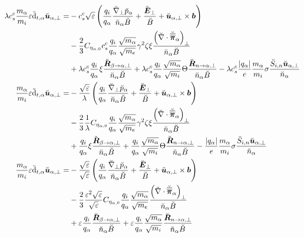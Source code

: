 \begin{align*}
    \lambda c^c_s \frac{m_\a}{m_i} \e \breve{\d}_{t,\a}\breve{\ve{u}}_{\a,\perp}
 =&
 - c^c_s \sqrt{\e} \L( \frac{q_i}{q_\a} \frac{ \breve{\grad}_\perp \breve{p}_\a }{\breve{n}_\a \breve{B}} + \frac{\breve{\ve{E}}_\perp}{\breve{B}} + \breve{\ve{u}}_{\a,\perp}\times\ve{b} \R)
 \\&
 - \frac{2}{3} C_{\eta_{\a,0}} c^c_s \frac{q_i}{q_\a} \frac{\sqrt{m_\a}}{\sqrt{m_e}} \gamma^2 \zeta \xi \frac{ \L(\breve{\grad}\cdot\breve{\te{\pi}}_\a\R)_\perp }{\breve{n}_\a \breve{B}}
 \\&
 + \lambda c^c_s \frac{q_i}{q_\a} \xi \frac{\breve{\ve{R}}_{\beta \to \a,\perp} }{\breve{n}_\a \breve{B}}
 + \lambda c^c_s\frac{q_i}{q_\a} \frac{\sqrt{m_\a}}{\sqrt{m_i}} \Theta \frac{\breve{\ve{R}}_{n \to \a,\perp} }{\breve{n}_\a  \breve{B}}
 - \lambda c^c_s \frac{|q_\a|}{e} \frac{m_\a}{m_i} \sigma \frac{ \breve{S}_{i,n}\breve{\ve{u}}_{\a,\perp} }{\breve{n}_\a}
 \\
 \frac{m_\a}{m_i} \e \breve{\d}_{t,\a}\breve{\ve{u}}_{\a,\perp}
 =&
 - \frac{\sqrt{\e}}{\lambda} \L( \frac{q_i}{q_\a} \frac{ \breve{\grad}_\perp \breve{p}_\a }{\breve{n}_\a \breve{B}} + \frac{\breve{\ve{E}}_\perp}{\breve{B}} + \breve{\ve{u}}_{\a,\perp}\times\ve{b} \R)
 \\&
 - \frac{2}{3} \frac{1}{\lambda} C_{\eta_{\a,0}} \frac{q_i}{q_\a} \frac{\sqrt{m_\a}}{\sqrt{m_e}} \gamma^2 \zeta \xi \frac{ \L(\breve{\grad}\cdot\breve{\te{\pi}}_\a\R)_\perp }{\breve{n}_\a \breve{B}}
 \\&
 + \frac{q_i}{q_\a} \xi \frac{\breve{\ve{R}}_{\beta \to \a,\perp} }{\breve{n}_\a \breve{B}}
 + \frac{q_i}{q_\a} \frac{\sqrt{m_\a}}{\sqrt{m_i}} \Theta \frac{\breve{\ve{R}}_{n \to \a,\perp} }{\breve{n}_\a  \breve{B}}
 - \frac{|q_\a|}{e} \frac{m_\a}{m_i} \sigma \frac{ \breve{S}_{i,n}\breve{\ve{u}}_{\a,\perp} }{\breve{n}_\a}
 \\
 \frac{m_\a}{m_i} \e \breve{\d}_{t,\a}\breve{\ve{u}}_{\a,\perp}
 =&
 - \frac{\sqrt{\e}}{\sqrt{\e}} \L( \frac{q_i}{q_\a} \frac{ \breve{\grad}_\perp \breve{p}_\a }{\breve{n}_\a \breve{B}} + \frac{\breve{\ve{E}}_\perp}{\breve{B}} + \breve{\ve{u}}_{\a,\perp}\times\ve{b} \R)
 \\&
 - \frac{2}{3} \frac{\e^2 \sqrt{\e}}{\sqrt{\e}} C_{\eta_{\a,0}} \frac{q_i}{q_\a} \frac{\sqrt{m_\a}}{\sqrt{m_e}} \frac{ \L(\breve{\grad}\cdot\breve{\te{\pi}}_\a\R)_\perp }{\breve{n}_\a \breve{B}}
 \\&
 +\e \frac{q_i}{q_\a} \frac{\breve{\ve{R}}_{\beta \to \a,\perp} }{\breve{n}_\a \breve{B}}
 +\e \frac{q_i}{q_\a} \frac{\sqrt{m_\a}}{\sqrt{m_i}}  \frac{\breve{\ve{R}}_{n \to \a,\perp} }{\breve{n}_\a  \breve{B}}

\end{align*}
